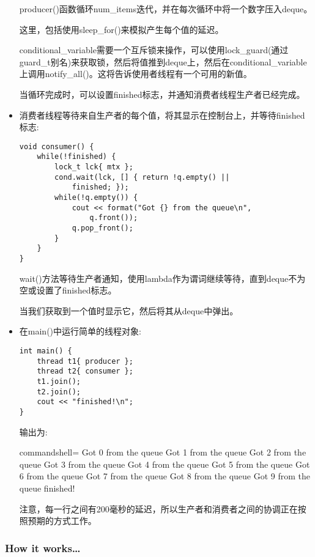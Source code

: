 \begin{itemize}
producer()函数循环num\_items迭代，并在每次循环中将一个数字压入deque。

这里，包括使用sleep\_for()来模拟产生每个值的延迟。

conditional\_variable需要一个互斥锁来操作，可以使用lock\_guard(通过guard\_t别名)来获取锁，然后将值推到deque上，然后在conditional\_variable上调用notify\_all()。这将告诉使用者线程有一个可用的新值。

当循环完成时，可以设置finished标志，并通知消费者线程生产者已经完成。

\item 
消费者线程等待来自生产者的每个值，将其显示在控制台上，并等待finished标志:

\begin{lstlisting}[style=styleCXX]
void consumer() {
	while(!finished) {
		lock_t lck{ mtx };
		cond.wait(lck, [] { return !q.empty() ||
			finished; });
		while(!q.empty()) {
			cout << format("Got {} from the queue\n",
				q.front());
			q.pop_front();
		}
	}
}
\end{lstlisting}

wait()方法等待生产者通知，使用lambda作为谓词继续等待，直到deque不为空或设置了finished标志。

当我们获取到一个值时显示它，然后将其从deque中弹出。

\item 
在main()中运行简单的线程对象:

\begin{lstlisting}[style=styleCXX]
int main() {
	thread t1{ producer };
	thread t2{ consumer };
	t1.join();
	t2.join();
	cout << "finished!\n";
}
\end{lstlisting}

输出为:

\begin{tcblisting}{commandshell={}}
Got 0 from the queue
Got 1 from the queue
Got 2 from the queue
Got 3 from the queue
Got 4 from the queue
Got 5 from the queue
Got 6 from the queue
Got 7 from the queue
Got 8 from the queue
Got 9 from the queue
finished!
\end{tcblisting}

注意，每一行之间有200毫秒的延迟，所以生产者和消费者之间的协调正在按照预期的方式工作。

\end{itemize}

\subsubsection{How it works…}

